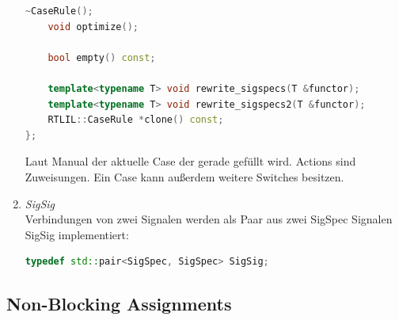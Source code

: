 \documentclass[11pt]{report}
\begin{document}
\begin{enumerate}
\begin{lstlisting}[language=C++]
	~CaseRule();
	void optimize();

	bool empty() const;

	template<typename T> void rewrite_sigspecs(T &functor);
	template<typename T> void rewrite_sigspecs2(T &functor);
	RTLIL::CaseRule *clone() const;
};
\end{lstlisting}
Laut Manual der aktuelle Case der gerade gefüllt wird. Actions sind Zuweisungen. Ein Case kann außerdem weitere Switches besitzen.
\item \textit{SigSig}\\
Verbindungen von zwei Signalen werden als Paar aus zwei SigSpec Signalen SigSig implementiert:
\begin{lstlisting}[language=C++]
	typedef std::pair<SigSpec, SigSpec> SigSig;
\end{lstlisting}

\end{enumerate}



\subsection{Non-Blocking Assignments}
\end{document}
